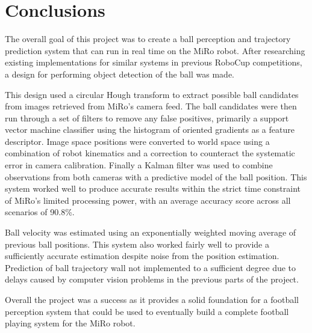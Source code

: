 \chapter{Conclusions}
\label{chapter: 7}

The overall goal of this project was to create a ball perception and trajectory prediction system that can run in real time on the MiRo robot. After researching existing implementations for similar systems in previous RoboCup competitions, a design for performing object detection of the ball was made. 

This design used a circular Hough transform to extract possible ball candidates from images retrieved from MiRo's camera feed. The ball candidates were then run through a set of filters to remove any false positives, primarily a support vector machine classifier using the histogram of oriented gradients as a feature descriptor. Image space positions were converted to world space using a combination of robot kinematics and a correction to counteract the systematic error in camera calibration. Finally a Kalman filter was used to combine observations from both cameras with a predictive model of the ball position. This system worked well to produce accurate results within the strict time constraint of MiRo's limited processing power, with an average accuracy score across all scenarios of 90.8\%. 

Ball velocity was estimated using an exponentially weighted moving average of previous ball positions. This system also worked fairly well to provide a sufficiently accurate estimation despite noise from the position estimation. Prediction of ball trajectory wall not implemented to a sufficient degree due to delays caused by computer vision problems in the previous parts of the project. 

Overall the project was a success as it provides a solid foundation for a football perception system that could be used to eventually build a complete football playing system for the MiRo robot. 